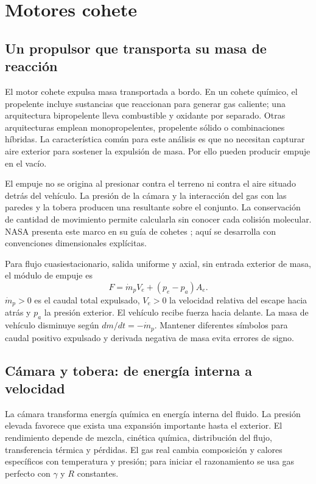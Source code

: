 \chapter{Motores cohete}\label{ch:20}

\section{Un propulsor que transporta su masa de reacción}
El motor cohete expulsa masa transportada a bordo. En un cohete químico, el propelente incluye sustancias que reaccionan para generar gas caliente; una arquitectura bipropelente lleva combustible y oxidante por separado. Otras arquitecturas emplean monopropelentes, propelente sólido o combinaciones híbridas. La característica común para este análisis es que no necesitan capturar aire exterior para sostener la expulsión de masa. Por ello pueden producir empuje en el vacío.

El empuje no se origina al presionar contra el terreno ni contra el aire situado detrás del vehículo. La presión de la cámara y la interacción del gas con las paredes y la tobera producen una resultante sobre el conjunto. La conservación de cantidad de movimiento permite calcularla sin conocer cada colisión molecular. NASA presenta este marco en su guía de cohetes \cite{NASA-ROCKET}; aquí se desarrolla con convenciones dimensionales explícitas.

Para flujo cuasiestacionario, salida uniforme y axial, sin entrada exterior de masa, el módulo de empuje es
\begin{equation}
 F=\dot m_p V_e+(p_e-p_a)A_e.
\end{equation}
$\dot m_p>0$ es el caudal total expulsado, $V_e>0$ la velocidad relativa del escape hacia atrás y $p_a$ la presión exterior. El vehículo recibe fuerza hacia delante. La masa de vehículo disminuye según $dm/dt=-\dot m_p$. Mantener diferentes símbolos para caudal positivo expulsado y derivada negativa de masa evita errores de signo.


\section{Cámara y tobera: de energía interna a velocidad}
La cámara transforma energía química en energía interna del fluido. La presión elevada favorece que exista una expansión importante hasta el exterior. El rendimiento depende de mezcla, cinética química, distribución del flujo, transferencia térmica y pérdidas. El gas real cambia composición y calores específicos con temperatura y presión; para iniciar el razonamiento se usa gas perfecto con $\gamma$ y $R$ constantes.

